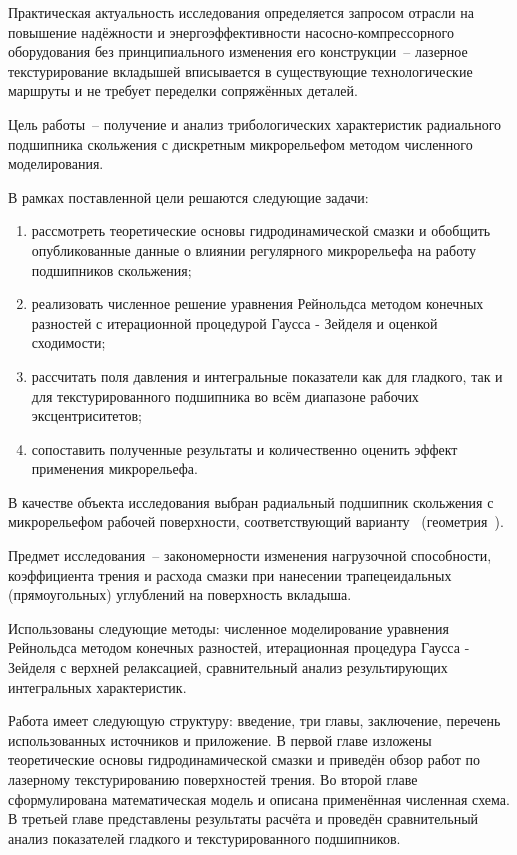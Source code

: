 Практическая актуальность исследования определяется запросом отрасли на повышение надёжности и энергоэффективности насосно-компрессорного оборудования без принципиального изменения его конструкции~-- лазерное текстурирование вкладышей вписывается в существующие технологические маршруты и не требует переделки сопряжённых деталей.

Цель работы~-- получение и анализ трибологических характеристик радиального подшипника скольжения с дискретным микрорельефом методом численного моделирования.

В рамках поставленной цели решаются следующие задачи:
\begin{enumerate}
    \item рассмотреть теоретические основы гидродинамической смазки и обобщить опубликованные данные о влиянии регулярного микрорельефа на работу подшипников скольжения;
    \item реализовать численное решение уравнения Рейнольдса методом конечных разностей с итерационной процедурой Гаусса - Зейделя и оценкой сходимости;
    \item рассчитать поля давления и интегральные показатели как для гладкого, так и для текстурированного подшипника во всём диапазоне рабочих эксцентриситетов;
    \item сопоставить полученные результаты и количественно оценить эффект применения микрорельефа.
\end{enumerate}

В качестве объекта исследования выбран радиальный подшипник скольжения с \varDimpleTypeGenitive{} микрорельефом рабочей поверхности, соответствующий варианту~\varNumber{} (геометрия~\varGeomLetter).

Предмет исследования~-- закономерности изменения нагрузочной способности, коэффициента трения и расхода смазки при нанесении трапецеидальных (прямоугольных) углублений на поверхность вкладыша.

Использованы следующие методы: численное моделирование уравнения Рейнольдса методом конечных разностей, итерационная процедура Гаусса - Зейделя с верхней релаксацией, сравнительный анализ результирующих интегральных характеристик.

Работа имеет следующую структуру: введение, три главы, заключение, перечень использованных источников и приложение. В первой главе изложены теоретические основы гидродинамической смазки и приведён обзор работ по лазерному текстурированию поверхностей трения. Во второй главе сформулирована математическая модель и описана применённая численная схема. В третьей главе представлены результаты расчёта и проведён сравнительный анализ показателей гладкого и текстурированного подшипников.
